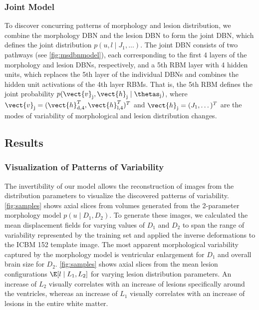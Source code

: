\subsubsection{Joint Model}

To discover concurring patterns of morphology and lesion distribution, we
combine the morphology DBN and the lesion DBN to form the joint DBN, which
defines the joint distribution $p(u, l \mid J_1, \dotsc)$. The joint DBN
consists of two pathways (see \ref{fig:msdbnmodel}), each corresponding to the
first 4 layers of the morphology and lesion DBNs, respectively, and a 5th RBM
layer with 4 hidden units, which replaces the 5th layer of the individual DBNs
and combines the hidden unit activations of the 4th layer RBMs. That is, the 5th
RBM defines the joint probability $p(\vect{v}_\text{j}, \vect{h}_\text{j} \mid
\thetas_\text{j})$, where $\vect{v}_\text{j} = (\vect{h}_{\text{d},4}^T,
\vect{h}_{\text{l},4}^T)^T$ and $\vect{h}_\text{j} = (J_1, \dotsc)^T$ are the
modes of variability of morphological and lesion distribution changes.

\subsection{Results}

\subsubsection{Visualization of Patterns of Variability}

The invertibility of our model allows the reconstruction of images from the
distribution parameters to visualize the discovered patterns of variability.
\ref{fig:samples} shows axial slices from volumes
generated from the 2-parameter morphology model $p(u \mid D_1, D_2)$. To generate these images, we
calculated the mean displacement fields for varying values of $D_1$ and $D_2$
to span the range of variability represented by the
training set and applied the inverse deformations to the ICBM 152 template
image. The most apparent morphological variability captured by the morphology
model is ventricular enlargement for $D_1$ and overall brain size for $D_2$.
\ref{fig:samples} shows axial slices from the mean lesion
configurations $\E[l \mid L_1, L_2]$ for varying lesion distribution parameters. An increase of
$L_2$ visually correlates with an increase of lesions specifically around the
ventricles, whereas an increase of $L_1$ visually correlates with an increase of
lesions in the entire white matter.

